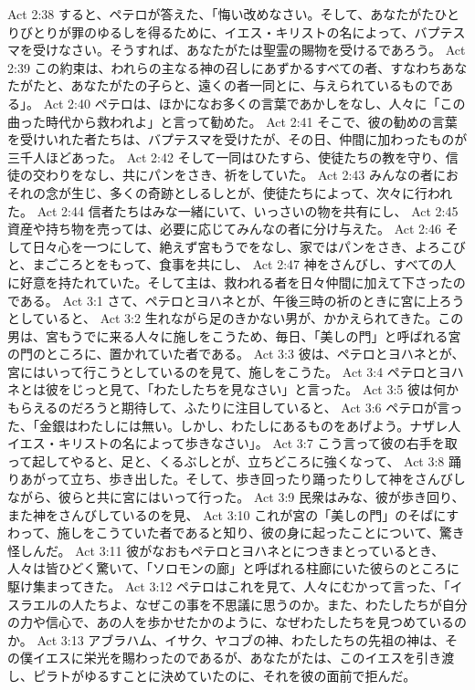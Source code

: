 Act 2:38  すると、ペテロが答えた、「悔い改めなさい。そして、あなたがたひとりびとりが罪のゆるしを得るために、イエス・キリストの名によって、バプテスマを受けなさい。そうすれば、あなたがたは聖霊の賜物を受けるであろう。
Act 2:39  この約束は、われらの主なる神の召しにあずかるすべての者、すなわちあなたがたと、あなたがたの子らと、遠くの者一同とに、与えられているものである」。
Act 2:40  ペテロは、ほかになお多くの言葉であかしをなし、人々に「この曲った時代から救われよ」と言って勧めた。
Act 2:41  そこで、彼の勧めの言葉を受けいれた者たちは、バプテスマを受けたが、その日、仲間に加わったものが三千人ほどあった。
Act 2:42  そして一同はひたすら、使徒たちの教を守り、信徒の交わりをなし、共にパンをさき、祈をしていた。
Act 2:43  みんなの者におそれの念が生じ、多くの奇跡としるしとが、使徒たちによって、次々に行われた。
Act 2:44  信者たちはみな一緒にいて、いっさいの物を共有にし、
Act 2:45  資産や持ち物を売っては、必要に応じてみんなの者に分け与えた。
Act 2:46  そして日々心を一つにして、絶えず宮もうでをなし、家ではパンをさき、よろこびと、まごころとをもって、食事を共にし、
Act 2:47  神をさんびし、すべての人に好意を持たれていた。そして主は、救われる者を日々仲間に加えて下さったのである。
Act 3:1  さて、ペテロとヨハネとが、午後三時の祈のときに宮に上ろうとしていると、
Act 3:2  生れながら足のきかない男が、かかえられてきた。この男は、宮もうでに来る人々に施しをこうため、毎日、「美しの門」と呼ばれる宮の門のところに、置かれていた者である。
Act 3:3  彼は、ペテロとヨハネとが、宮にはいって行こうとしているのを見て、施しをこうた。
Act 3:4  ペテロとヨハネとは彼をじっと見て、「わたしたちを見なさい」と言った。
Act 3:5  彼は何かもらえるのだろうと期待して、ふたりに注目していると、
Act 3:6  ペテロが言った、「金銀はわたしには無い。しかし、わたしにあるものをあげよう。ナザレ人イエス・キリストの名によって歩きなさい」。
Act 3:7  こう言って彼の右手を取って起してやると、足と、くるぶしとが、立ちどころに強くなって、
Act 3:8  踊りあがって立ち、歩き出した。そして、歩き回ったり踊ったりして神をさんびしながら、彼らと共に宮にはいって行った。
Act 3:9  民衆はみな、彼が歩き回り、また神をさんびしているのを見、
Act 3:10  これが宮の「美しの門」のそばにすわって、施しをこうていた者であると知り、彼の身に起ったことについて、驚き怪しんだ。
Act 3:11  彼がなおもペテロとヨハネとにつきまとっているとき、人々は皆ひどく驚いて、「ソロモンの廊」と呼ばれる柱廊にいた彼らのところに駆け集まってきた。
Act 3:12  ペテロはこれを見て、人々にむかって言った、「イスラエルの人たちよ、なぜこの事を不思議に思うのか。また、わたしたちが自分の力や信心で、あの人を歩かせたかのように、なぜわたしたちを見つめているのか。
Act 3:13  アブラハム、イサク、ヤコブの神、わたしたちの先祖の神は、その僕イエスに栄光を賜わったのであるが、あなたがたは、このイエスを引き渡し、ピラトがゆるすことに決めていたのに、それを彼の面前で拒んだ。
